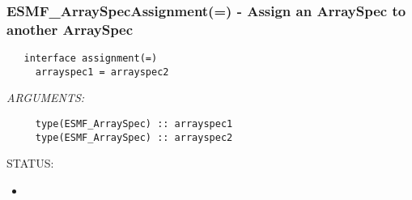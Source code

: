  
\setlength{\oldparskip}{\parskip}
\setlength{\parskip}{1.5ex}
\setlength{\oldparindent}{\parindent}
\setlength{\parindent}{0pt}
\setlength{\oldbaselineskip}{\baselineskip}
\setlength{\baselineskip}{11pt}
 
\def\bv{\begin{verbatim}}
\def\ev{\end{verbatim}}
\def\be{\begin{equation}}
\def\ee{\end{equation}}
\def\bea{\begin{eqnarray}}
\def\eea{\end{eqnarray}}
\def\bi{\begin{itemize}}
\def\ei{\end{itemize}}
\def\bn{\begin{enumerate}}
\def\en{\end{enumerate}}
\def\bd{\begin{description}}
\def\ed{\end{description}}
\def\({\left (}
\def\){\right )}
\def\[{\left [}
\def\]{\right ]}
\def\<{\left  \langle}
\def\>{\right \rangle}
\def\cI{{\cal I}}
\def\diag{\mathop{\rm diag}}
\def\tr{\mathop{\rm tr}}


 
\subsubsection [ESMF\_ArraySpecAssignment(=)] {ESMF\_ArraySpecAssignment(=) - Assign an ArraySpec to another ArraySpec}


  
\begin{verbatim}   interface assignment(=)
     arrayspec1 = arrayspec2\end{verbatim}{\em ARGUMENTS:}
\begin{verbatim}     type(ESMF_ArraySpec) :: arrayspec1
     type(ESMF_ArraySpec) :: arrayspec2\end{verbatim}
{\sf STATUS:}
   \begin{itemize}
   \item{}
   \end{itemize}
  
